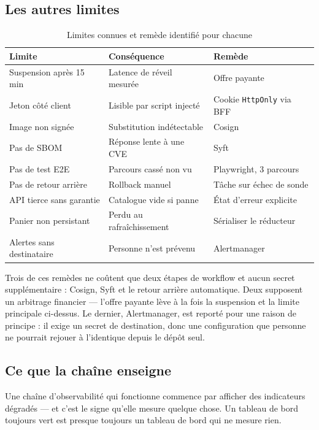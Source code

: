 \documentclass[11pt,a4paper]{article}
\begin{document}
\subsection{Les autres limites}

\begin{table}[htbp]
\centering
\small
\begin{tabular}{@{}l l l@{}}
\toprule
\textbf{Limite} & \textbf{Conséquence} & \textbf{Remède} \\
\midrule
Suspension après 15 min    & Latence de réveil mesurée   & Offre payante \\
Jeton côté client          & Lisible par script injecté  & Cookie \texttt{HttpOnly} via BFF \\
Image non signée           & Substitution indétectable   & Cosign \\
Pas de SBOM                & Réponse lente à une CVE     & Syft \\
Pas de test E2E            & Parcours cassé non vu       & Playwright, 3 parcours \\
Pas de retour arrière      & Rollback manuel             & Tâche sur échec de sonde \\
API tierce sans garantie   & Catalogue vide si panne     & État d'erreur explicite \\
Panier non persistant      & Perdu au rafraîchissement   & Sérialiser le réducteur \\
Alertes sans destinataire  & Personne n'est prévenu      & Alertmanager \\
\bottomrule
\end{tabular}
\caption{Limites connues et remède identifié pour chacune}
\label{tab:limites}
\end{table}

Trois de ces remèdes ne coûtent que deux étapes de workflow et aucun secret
supplémentaire : Cosign, Syft et le retour arrière automatique. Deux
supposent un arbitrage financier — l'offre payante lève à la fois la
suspension et la limite principale ci-dessus. Le dernier, Alertmanager, est
reporté pour une raison de principe : il exige un secret de destination,
donc une configuration que personne ne pourrait rejouer à l'identique depuis
le dépôt seul.

\subsection*{Ce que la chaîne enseigne}

Une chaîne d'observabilité qui fonctionne commence par afficher des
indicateurs dégradés — et c'est le signe qu'elle mesure quelque chose. Un
tableau de bord toujours vert est presque toujours un tableau de bord qui ne
mesure rien.
\end{document}
